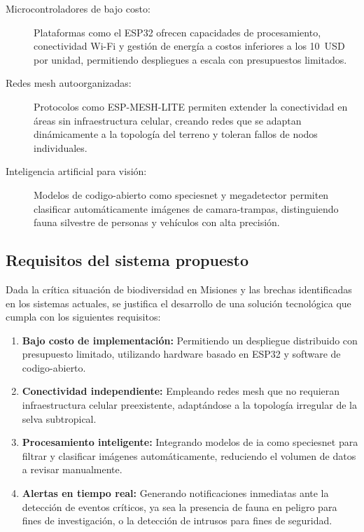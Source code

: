 \documentclass[a4paper, 12pt]{report}
\begin{document}
\begin{description}
  \item[Microcontroladores de bajo costo:] Plataformas como el \gls{ESP32}
    ofrecen capacidades de procesamiento, conectividad Wi-Fi y gestión
    de energía a costos inferiores a los \qty{10}{USD} por unidad, permitiendo
    despliegues a escala con presupuestos limitados.
  \item[Redes mesh autoorganizadas:] Protocolos como \gls{ESP-MESH-LITE} permiten
    extender la conectividad en áreas sin infraestructura celular,
    creando redes que se adaptan dinámicamente a la topología del terreno
    y toleran fallos de nodos individuales.
  \item[Inteligencia artificial para visión:] Modelos de \gls{codigo-abierto}
    como \gls{speciesnet} \cite{gadot2024crop} y \gls{megadetector}
    \cite{beery2019megadetector} permiten clasificar automáticamente
    imágenes de \glspl{camara-trampa}, distinguiendo fauna silvestre
    de personas y vehículos con alta precisión.
\end{description}

\subsection{Requisitos del sistema propuesto}

Dada la crítica situación de biodiversidad en Misiones y las brechas identificadas
en los sistemas actuales, se justifica el desarrollo de una solución tecnológica
que cumpla con los siguientes requisitos:

\begin{enumerate}
  \item \textbf{Bajo costo de implementación:} Permitiendo un despliegue
    distribuido con presupuesto limitado, utilizando hardware basado en
    \gls{ESP32} y software de \gls{codigo-abierto}.
  \item \textbf{Conectividad independiente:} Empleando redes \gls{mesh} que
    no requieran infraestructura celular preexistente, adaptándose a la
    topología irregular de la selva subtropical.
  \item \textbf{Procesamiento inteligente:} Integrando modelos de \gls{ia}
    como \gls{speciesnet} para filtrar y clasificar imágenes automáticamente,
    reduciendo el volumen de datos a revisar manualmente.
  \item \textbf{Alertas en tiempo real:} Generando notificaciones inmediatas
    ante la detección de eventos críticos, ya sea la presencia de fauna
    en peligro para fines de investigación, o la detección de intrusos
    para fines de seguridad.
\end{enumerate}
\end{document}
